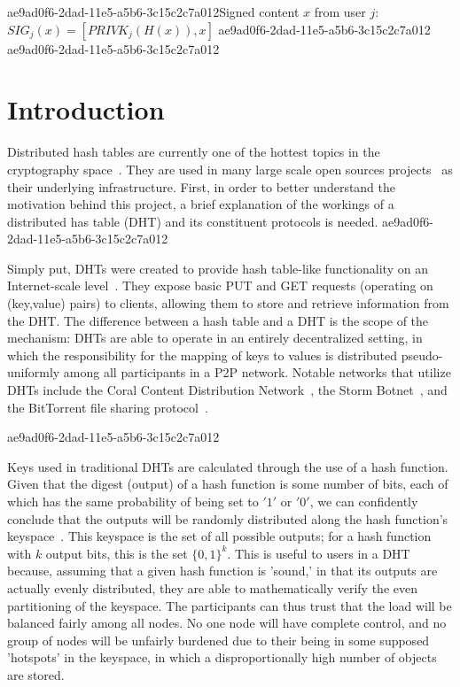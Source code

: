 \documentclass[12pt]{article}
\begin{document}
ae9ad0f6-2dad-11e5-a5b6-3c15c2c7a012Signed content $x$ from user $j$: $SIG_j(x) = \left[ PRIVK_j( H(x) ), x \right]$
ae9ad0f6-2dad-11e5-a5b6-3c15c2c7a012
ae9ad0f6-2dad-11e5-a5b6-3c15c2c7a012\section{Introduction}
\par Distributed hash tables are currently one of the hottest topics in the cryptography space~\cite{Stoica:2001dj,Rowstron:2001ea,Ratnasamy:2001wn}. They are used in many large scale open sources projects~\cite{Freitas:2013tb,Xu:2010vs,Perfitt:2010fh} as their underlying infrastructure. First, in order to better understand the motivation behind this project, a brief explanation of the workings of a distributed has table (DHT) and its constituent protocols is needed.
ae9ad0f6-2dad-11e5-a5b6-3c15c2c7a012
\par Simply put, DHTs were created to provide hash table-like functionality on an Internet-scale level~\cite{Ratnasamy:2001wn}. They expose basic PUT and GET requests (operating on (key,value) pairs) to clients, allowing them to store and retrieve information from the DHT. The difference between a hash table and a DHT is the scope of the mechanism: DHTs are able to operate in an entirely decentralized setting, in which the responsibility for the mapping of keys to values is distributed pseudo-uniformly among all participants in a P2P network. Notable networks that utilize DHTs include the Coral Content Distribution Network~\cite{Freedman:2004vb}, the Storm Botnet~\cite{Holz:2008uk}, and the BitTorrent file sharing protocol~\cite{Cohen:y1_8mBnw}.

ae9ad0f6-2dad-11e5-a5b6-3c15c2c7a012\par Keys used in traditional DHTs are calculated through the use of a hash function. Given that the digest (output) of a hash function is some number of bits, each of which has the same probability of being set to $'1'$ or $'0'$, we can confidently conclude that the outputs will be randomly distributed along the hash function's keyspace~. This keyspace is the set of all possible outputs; for a hash function with $k$ output bits, this is the set $\{0,1\}^k$. This is useful to users in a DHT because, assuming that a given hash function is 'sound,' in that its outputs are actually evenly distributed, they are able to mathematically verify the even partitioning of the keyspace. The participants can thus trust that the load will be balanced fairly among all nodes. No one node will have complete control, and no group of nodes will be unfairly burdened due to their being in some supposed 'hotspots' in the keyspace, in which a disproportionally high number of objects are stored.~
\end{document}
